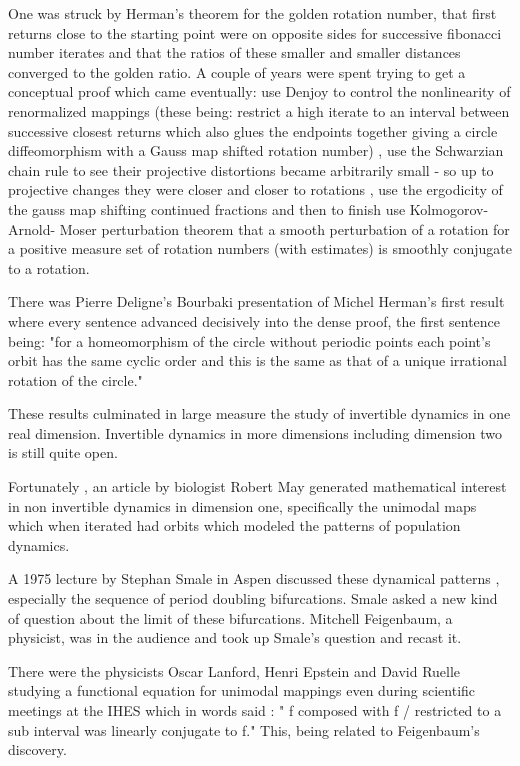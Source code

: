\begin{description}
 One was struck by Herman's theorem for the golden rotation number, that first returns  close to the  starting point were on opposite sides for successive fibonacci number  iterates and  that the ratios of these smaller and smaller distances  converged to the golden ratio.  A couple of years  were spent trying to get  a  conceptual proof which came  eventually:
use Denjoy to control the nonlinearity of  renormalized mappings (these being: restrict a high iterate to an interval between successive closest returns which also glues the endpoints together giving a circle diffeomorphism with a Gauss map shifted rotation number) ,
use the Schwarzian chain rule to see  their  projective distortions  became  arbitrarily small - so up to projective changes they were  closer and closer  to rotations , use the ergodicity of the gauss map shifting continued fractions  and  then to finish use  Kolmogorov- Arnold- Moser  perturbation theorem that a smooth perturbation of a rotation for a positive measure set of rotation numbers  (with estimates) is smoothly conjugate to a rotation.

 There was  Pierre Deligne's  Bourbaki presentation of Michel Herman's  first result where every sentence advanced decisively into the dense proof, the first sentence being: "for a homeomorphism of the circle without periodic points  each point's orbit has the same cyclic order  and this is the same as that of a unique irrational rotation of the circle."

These results culminated in large measure the study of invertible dynamics in one  real dimension.
Invertible dynamics in more dimensions including dimension two  is still quite open.

 Fortunately , an  article by biologist Robert May  generated mathematical interest in non invertible  dynamics in dimension one, specifically the unimodal maps which when iterated had orbits which  modeled the patterns of population dynamics.

    A  1975 lecture by Stephan Smale in Aspen discussed these  dynamical patterns , especially the  sequence of period doubling bifurcations. Smale asked a new kind of question about the limit of these bifurcations. Mitchell Feigenbaum,  a physicist, was in the audience and took up Smale's question and recast it.

    There were the  physicists   Oscar Lanford, Henri Epstein and David Ruelle  studying a functional equation  for unimodal mappings  even during scientific meetings at the IHES which in words said :
" f composed with f / restricted to a sub interval was linearly conjugate to f." This, being related to Feigenbaum's discovery.


\end{description}

